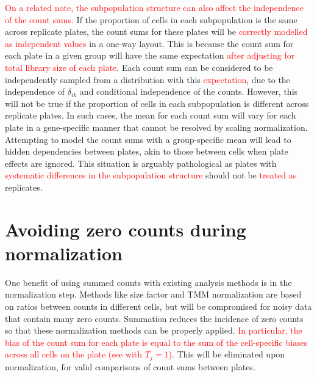 \documentclass{article}
\newcommand\revised[1]{\textcolor{red}{#1}}
\begin{document}
\revised{On a related note, the subpopulation structure can also affect the independence of the count sums.}
If the proportion of cells in each subpopulation is the same across replicate plates, the count sums for these plates will be \revised{correctly modelled as independent values} in a one-way layout.
This is because the count sum for each plate in a given group will have the same expectation \revised{after adjusting for total library size of each plate}.
Each count sum can be considered to be independently sampled from a distribution with this \revised{expectation}, due to the independence of $\delta_{ik}$ and conditional independence of the counts.
However, this will not be true if the proportion of cells in each subpopulation is different across replicate plates.
In such cases, the mean for each count sum will vary for each plate in a gene-specific manner that cannot be resolved by scaling normalization.
Attempting to model the count sums with a group-specific mean will lead to hidden dependencies between plates, akin to those between cells when plate effects are ignored.
This situation is arguably pathological as plates with \revised{systematic differences in the subpopulation structure} should not be \revised{treated as} replicates.


\section{Avoiding zero counts during normalization}
One benefit of using summed counts with existing analysis methods is in the normalization step.
Methods like size factor and TMM normalization are based on ratios between counts in different cells, but will be compromised for noisy data that contain many zero counts.
Summation reduces the incidence of zero counts so that these normalization methods can be properly applied.
\revised{In particular, the bias of the count sum for each plate is equal to the sum of the cell-specific biases across all cells on the plate (see \cite{lun2016pooling} with $T_j=1$).}
This will be eliminated upon normalization, for valid comparisons of count sums between plates.
\end{document}
